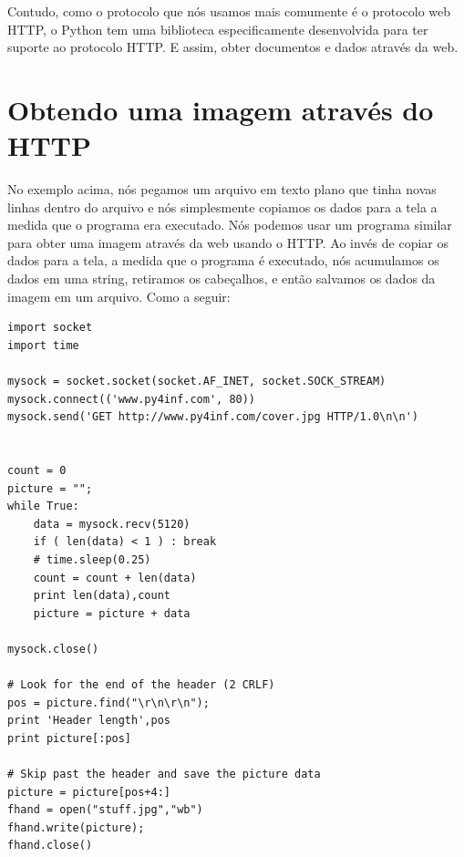 Contudo, como o protocolo que nós usamos mais  comumente é o protocolo web
HTTP, o Python tem uma biblioteca especificamente desenvolvida para ter suporte
ao protocolo HTTP. E assim, obter documentos e dados através da web.

\section{Obtendo uma imagem através do HTTP}

No exemplo acima, nós pegamos um arquivo em texto plano que tinha novas linhas
dentro do arquivo e nós simplesmente copiamos os dados para a tela a medida
que o programa era executado. Nós podemos usar um programa similar para obter
uma imagem através da web usando o HTTP. Ao invés de copiar os dados para a
tela, a medida que o programa é executado, nós acumulamos os dados em uma
string, retiramos os cabeçalhos, e então salvamos os dados da imagem em um
arquivo. Como a seguir:

\beforeverb
\begin{verbatim}
import socket
import time

mysock = socket.socket(socket.AF_INET, socket.SOCK_STREAM)
mysock.connect(('www.py4inf.com', 80))
mysock.send('GET http://www.py4inf.com/cover.jpg HTTP/1.0\n\n')


count = 0
picture = "";
while True:
    data = mysock.recv(5120)
    if ( len(data) < 1 ) : break
    # time.sleep(0.25)
    count = count + len(data)
    print len(data),count
    picture = picture + data

mysock.close()

# Look for the end of the header (2 CRLF)
pos = picture.find("\r\n\r\n");
print 'Header length',pos
print picture[:pos]

# Skip past the header and save the picture data
picture = picture[pos+4:]
fhand = open("stuff.jpg","wb")
fhand.write(picture);
fhand.close()
\end{verbatim}
\afterverb

